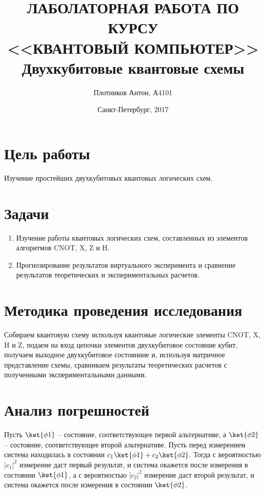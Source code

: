\documentclass{article}
\title{ЛАБОЛАТОРНАЯ РАБОТА ПО КУРСУ\\ <<КВАНТОВЫЙ КОМПЬЮТЕР>>\\
Двухкубитовые квантовые схемы}
\date{Санкт-Петербург, 2017}
\author{Плотников Антон, А4101}
\begin{document}
\maketitle
\newpage

\section{Цель работы}

Изучение простейших двухкубитовых квантовых логических схем.

\section{Задачи}

\begin{enumerate}
  \item Изучение работы квантовых логических схем, составленных из
    элементов алгоритмов CNOT, X, Z и H.

  \item Прогнозирование результатов виртуального эксперимента и сравнение
    результатов теоретических и экспериментальных расчетов.
\end{enumerate}

\section{Методика проведения исследования}

Собираем квантовую схему используя квантовые логические элементы CNOT, X, H и
Z, подаем на вход цепочки элементов двухкубитовое состояние кубит, получаем
выходное двухкубитовое состояниие и, используя матричное представление схемы,
сравниваем результаты теоретических расчетов с полученными экспериментальными
данными.

\section{Анализ погрешностей}

Пусть $\ket{\phi1}$ – состояние, соответствующее первой альтернативе, а
$\ket{\phi2}$ – состояние, соответствующее второй альтернативе. Пусть перед
измерением система находилась в состоянии $c_1\ket{\phi1} + c_2\ket{\phi2}$.
Тогда с вероятностью $|c_1|^2$ измерение даст первый результат, и система
окажется после измерения в состоянии $\ket{\phi1}$, а с вероятностью $|c_2|^2$
измерение даст второй результат, и система окажется после измерения в состоянии
$\ket{\phi2}$.
\end{document}
